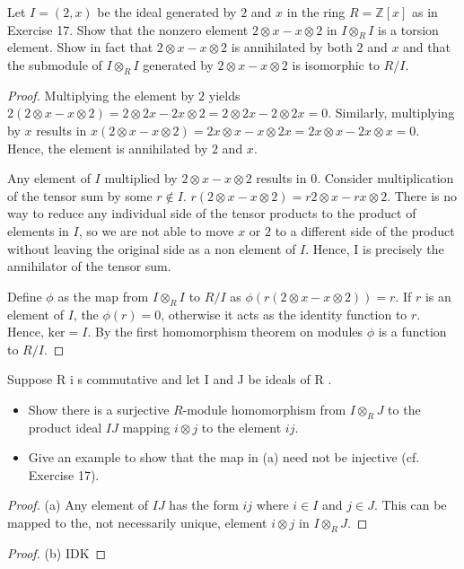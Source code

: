 \documentclass[10pt]{article}
\newcommand{\Z}{\mathbb{Z}}
\newenvironment{problem}[2][Problem]{\begin{trivlist}
		\item[\hskip \labelsep {\bfseries #1}\hskip \labelsep {\bfseries #2.}]}{\end{trivlist}}
\begin{document}
	\begin{problem}{4.19}
		Let $I = (2, x)$ be the ideal generated by $2$ and $x$ in the ring $R = \Z[x]$ as in Exercise 17. Show that the nonzero element $2 \otimes x - x \otimes 2$ in $I \otimes_R I$ is a torsion element. Show in	fact that $2 \otimes x - x \otimes 2$ is annihilated by both $2$ and $x$ and that the submodule of $I \otimes_R I$ generated by $2 \otimes x - x \otimes 2$ is isomorphic to $R/I$.
		\begin{proof}
			Multiplying the element by $2$ yields $2(2 \otimes x - x \otimes 2) = 2 \otimes 2x - 2x \otimes 2 = 2 \otimes 2x - 2 \otimes 2x = 0$. Similarly, multiplying by $x$ results in $x(2 \otimes x - x \otimes 2) = 2x \otimes x - x \otimes 2x = 2x \otimes x - 2x \otimes x = 0$. Hence, the element is annihilated by $2$ and $x$. 
			
			Any element of $I$ multiplied by $2 \otimes x - x \otimes 2$ results in $0$. Consider multiplication of the tensor sum by some $r \not \in I$. $r(2 \otimes x - x \otimes 2) = r2 \otimes x - rx \otimes 2$. There is no way to reduce any individual side of the tensor products to the product of elements in $I$, so we are not able to move $x$ or $2$ to a different side of the product without leaving the original side as a non element of $I$. Hence, I is precisely the annihilator of the tensor sum.
			
			Define $\phi$ as the map from $I \otimes_R I$ to $R/I$ as $\phi(r(2 \otimes x - x \otimes 2)) = r$. If $r$ is an element of $I$, the $\phi(r)=0$, otherwise it acts as the identity function to $r$. Hence, $\text{ker} = I$. By the first homomorphism theorem on modules $\phi$ is a function to $R/I$.
		\end{proof}	
	\end{problem}
	
	\begin{problem}{4.21}
		Suppose R i s commutative and let I and J be ideals of R .
		\begin{itemize}
			\item[\textbf{(a)}] Show there is a surjective $R$-module homomorphism from $I \otimes_R J$ to the product ideal $IJ$ mapping $i \otimes j$ to the element $ij$.
			\item[\textbf{(b)}] Give an example to show that the map in (a) need not be injective (cf. Exercise 17).
		\end{itemize}
		\begin{proof}{(a)}
			Any element of $IJ$ has the form $ij$ where $i \in I$ and $j\in J$. This can be mapped to the, not necessarily unique, element $i \otimes j$ in $I \otimes_R J$.
		\end{proof}
		\begin{proof}{(b)}
			IDK
		\end{proof}
	\end{problem}
	
\end{document}
